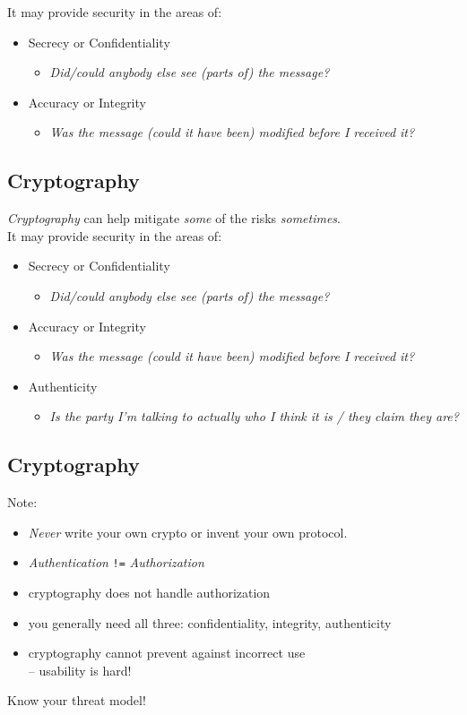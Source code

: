 \documentclass[xga]{xdvislides}
\begin{document}
It may provide security in the areas of:
\begin{itemize}
	\item Secrecy or Confidentiality
		\begin{itemize}
			\item {\em Did/could anybody else see (parts of) the message?}
		\end{itemize}
	\item Accuracy or Integrity
		\begin{itemize}
			\item {\em Was the message (could it have been) modified before I received it?}
		\end{itemize}
\end{itemize}

\subsection{Cryptography}
{\em Cryptography} can help mitigate {\em some} of the risks {\em sometimes}.
\\

It may provide security in the areas of:
\begin{itemize}
	\item Secrecy or Confidentiality
		\begin{itemize}
			\item {\em Did/could anybody else see (parts of) the message?}
		\end{itemize}
	\item Accuracy or Integrity
		\begin{itemize}
			\item {\em Was the message (could it have been) modified before I received it?}
		\end{itemize}
	\item Authenticity
		\begin{itemize}
			\item {\em Is the party I'm talking to actually
who I think it is / they claim they are?}
		\end{itemize}
\end{itemize}

\subsection{Cryptography}
Note:
\begin{itemize}
	\item {\em Never} write your own crypto or invent your own protocol.
	\item {\em Authentication} \verb+!=+ {\em Authorization}
	\item cryptography does not handle authorization
	\item you generally need all three: confidentiality, integrity, authenticity
	\item cryptography cannot prevent against incorrect use \\
		-- usability is hard!
\end{itemize}
\addvspace{.5in}
Know your threat model!
\end{document}
